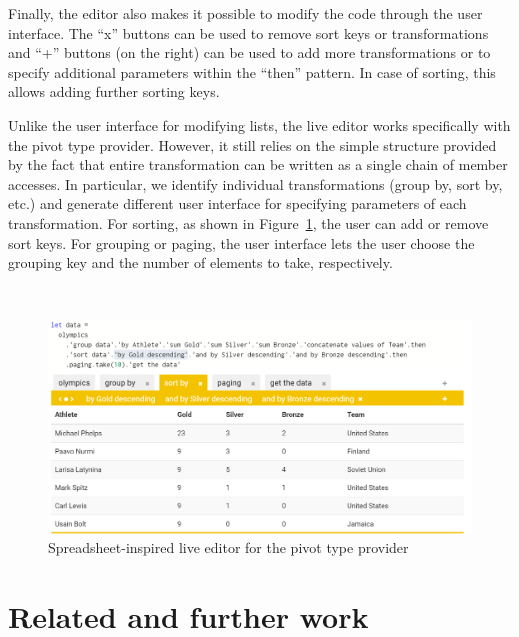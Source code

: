 \documentclass[a4paper,UKenglish]{lipics-v2016}
\theoremstyle{plain}
\theoremstyle{definition}
\newcommand{\qident}[1]{\textnormal{\sffamily \guillemotleft #1\guillemotright}}
\begin{document}
Finally, the editor also makes it possible to modify the code through the user interface. The
``x'' buttons can be used to remove sort keys or transformations and ``+'' buttons (on the right)
can be used to add more transformations or to specify additional parameters within the ``then'' 
pattern. In case of sorting, this allows adding further sorting keys.

Unlike the user interface for modifying lists, the live editor works specifically with the pivot 
type provider. However, it still relies on the simple structure provided by the fact that entire 
transformation can be written as a single chain of member accesses. In particular,
we identify individual transformations (\qident{group by}, \qident{sort by}, etc.) and 
generate different user interface for specifying parameters of each transformation. For sorting, as 
shown in Figure~\ref{fig:case-ed}, the user can add or remove sort keys. For grouping 
or paging, the user interface lets the user choose the grouping key and the number of 
elements to take, respectively.

~


\begin{figure}[t]
\begin{center}
\includegraphics[scale=0.35,trim=0mm 0mm 0mm 0mm,clip]{images/pivot.png} %
\end{center}
\caption{Spreadsheet-inspired live editor for the pivot type provider}
\label{fig:case-ed}
\end{figure}



\section{Related and further work}
\end{document}
